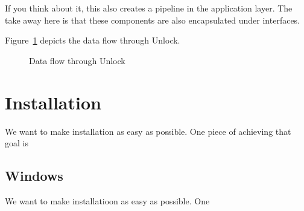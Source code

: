 \documentclass[11pt]{article}
\begin{document}
If you think about it, this also creates a pipeline in the application layer.  The take away here is that these components are also encapsulated under interfaces.

Figure~\ref{bci-pipeline-fig} depicts the data flow through Unlock.

\begin{figure}[]
\caption{\label{bci-pipeline-fig}  Data flow through Unlock}
\end{figure}



\section{Installation}

We want to make installation as easy as possible.  One piece of achieving that goal is 
\subsection{Windows}

We want to make installatioon as easy as possible.  One
\end{document}
